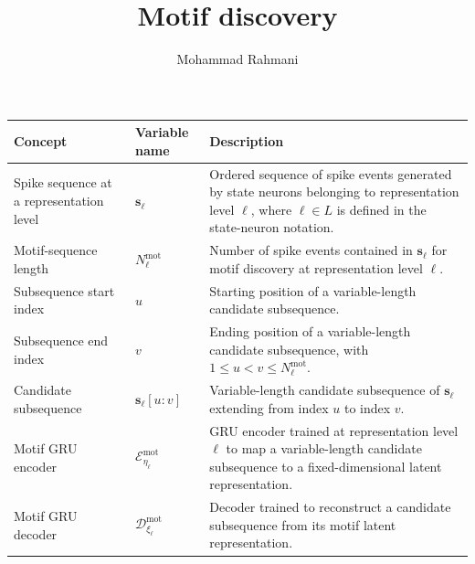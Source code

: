\documentclass[a4paper]{article}
\title{Motif discovery}
\date{}
\author{Mohammad Rahmani}
\begin{document}
   \maketitle

   \begin{table}[H]
      \centering
      \small
      \setlength{\tabcolsep}{4pt}

      \begin{tabular}{p{} p{} p{}}
         \hline
         \textbf{Concept} & \textbf{Variable name} & \textbf{Description} \\
         \hline

         Spike sequence at a representation level
         & $\mathbf{s}_{\ell}$
         & Ordered sequence of spike events generated by state neurons belonging to representation level $\ell$, where $\ell \in L$ is defined in the state-neuron notation. \\

         Motif-sequence length
         & $N_{\ell}^{\mathrm{mot}}$
         & Number of spike events contained in $\mathbf{s}_{\ell}$ for motif discovery at representation level $\ell$. \\

         Subsequence start index
         & $u$
         & Starting position of a variable-length candidate subsequence. \\

         Subsequence end index
         & $v$
         & Ending position of a variable-length candidate subsequence, with $1 \leq u < v \leq N_{\ell}^{\mathrm{mot}}$. \\

         Candidate subsequence
         & $\mathbf{s}_{\ell}[u:v]$
         & Variable-length candidate subsequence of $\mathbf{s}_{\ell}$ extending from index $u$ to index $v$. \\

         Motif GRU encoder
         & $\mathcal{E}^{\mathrm{mot}}_{\eta_{\ell}}$
         & GRU encoder trained at representation level $\ell$ to map a variable-length candidate subsequence to a fixed-dimensional latent representation. \\

         Motif GRU decoder
         & $\mathcal{D}^{\mathrm{mot}}_{\xi_{\ell}}$
         & Decoder trained to reconstruct a candidate subsequence from its motif latent representation. \\


\end{tabular}
\end{table}
\end{document}
